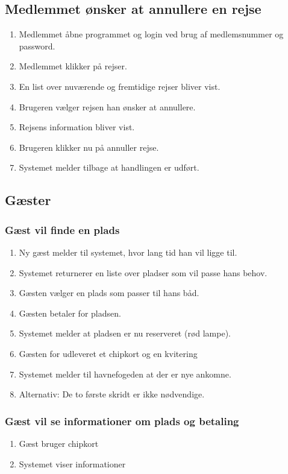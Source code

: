 	\subsection{Medlemmet ønsker at annullere en rejse}

	\begin{enumerate}
	\item Medlemmet åbne programmet og login ved brug af medlemsnummer og password.
	\item Medlemmet klikker på rejser.
	\item En list over nuværende og fremtidige rejser bliver vist.
	\item Brugeren vælger rejsen han ønsker at annullere.
	\item Rejsens information bliver vist.
	\item Brugeren klikker nu på annuller rejse.
	\item Systemet melder tilbage at handlingen er udført.
	\end{enumerate}

\subsection{Gæster}


\subsubsection{Gæst vil finde en plads}

    \begin{enumerate}
      \item Ny gæst melder til systemet, hvor lang tid han vil ligge til.
      \item Systemet returnerer en liste over pladser som vil passe hans behov.
      \item Gæsten vælger en plads som passer til hans båd.
      \item Gæsten betaler for pladsen.
      \item Systemet melder at pladsen er nu reserveret (rød lampe).
      \item Gæsten for udleveret et chipkort og en kvitering
      \item Systemet melder til havnefogeden at der er nye ankomne.
      \item Alternativ: De to første skridt er ikke nødvendige.
    \end{enumerate}

\subsubsection{Gæst vil se informationer om plads og betaling}
  \begin{enumerate}
    \item Gæst bruger chipkort
    \item Systemet viser informationer
  \end{enumerate}

